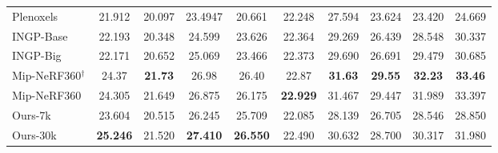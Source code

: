 \begin{appendix}
\begin{table}[H]
{\begin{tabular}{l|ccccc|cccc}
            Plenoxels & 21.912 & 20.097 & 23.4947 & 20.661 & 22.248 & 27.594 & 23.624 & 23.420 & 24.669 \\ 
            INGP-Base & 22.193 & 20.348 & 24.599 & 23.626 & 22.364  & 29.269 & 26.439 & 28.548 & 30.337 \\ 
            INGP-Big & 22.171 & 20.652 & 25.069 & 23.466 & 22.373  & 29.690 & 26.691 & 29.479 & 30.685 \\ 
            Mip-NeRF360$^\dagger$ & 24.37 & \textbf{21.73} & 26.98 & 26.40 & 22.87 & \textbf{31.63} & \textbf{29.55} & \textbf{32.23} & \textbf{33.46} \\
            Mip-NeRF360 & 24.305 & 21.649 & 26.875 & 26.175 & \textbf{22.929} & 31.467 & 29.447 & 31.989 & 33.397 \\
            Ours-7k & 23.604 & 20.515 & 26.245 & 25.709 & 22.085  & 28.139 & 26.705 & 28.546 & 28.850 \\ 
            Ours-30k & \textbf{25.246} & 21.520 & \textbf{27.410} & \textbf{26.550} & 22.490 & 30.632 & 28.700 & 30.317 & 31.980 \\ 
        \end{tabular}
    }
    \label{tab:360_scene_psnr}
\end{table}
    \begin{table}[H]
    \caption{LPIPS метрики для сцен Mip-NeRF360.  $\dagger$ скопировано из оригинальной статьи.}
\end{table}
\end{appendix}
